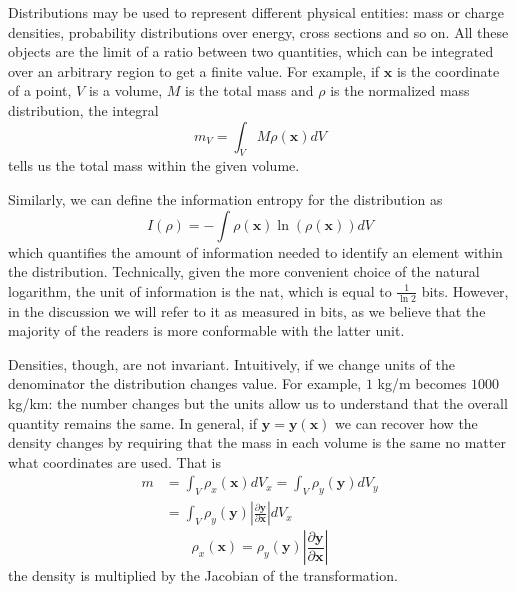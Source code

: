 \documentclass[smallextended]{svjour3}
\numberwithin{equation}{section}
\theoremstyle{definition}
\begin{document}
Distributions may be used to represent different  physical entities: mass or charge densities, probability distributions over energy, cross sections and so on. All these objects are the limit of a ratio between two quantities, which can be integrated over an arbitrary region to get a finite value. For example, if $\mathbf{x}$ is the coordinate of a point, $V$ is a volume, $M$ is the total mass and $\rho$ is the normalized mass distribution, the integral
\begin{equation}
m_V =\int_V M \rho(\mathbf{x}) dV
\end{equation}
tells us the total mass within the given volume.

Similarly, we can define the information entropy for the distribution as
\begin{equation}
I(\rho) =-\int \rho(\mathbf{x}) \ln (\rho(\mathbf{x})) dV
\end{equation}
which quantifies the amount of information needed to identify an element within the distribution. Technically, given the more convenient choice of the natural logarithm, the unit of information is the nat, which is equal to $\frac{1}{\ln 2}$ bits. However, in the discussion we will refer to it as measured in bits, as we believe that the majority of the readers is more conformable with the latter unit.

Densities, though, are not invariant. Intuitively, if we change units of the denominator the distribution changes value. For example, $1$ kg/m becomes $1000$ kg/km: the number changes but the units allow us to understand that the overall quantity remains the same. In general, if $\mathbf{y}=\mathbf{y}(\mathbf{x})$ we can recover how the density changes by requiring that the mass in each volume is the same no matter what coordinates are used. That is
\begin{align*}
m &=\int_V \rho_x(\mathbf{x}) dV_x = \int_V \rho_y(\mathbf{y}) dV_y \\
&=\int_V\rho_y(\mathbf{y}) \left|\frac{\partial \mathbf{y}}{\partial \mathbf{x}}\right| dV_x
\end{align*}
\begin{equation}\label{density_transformation}
\rho_x(\mathbf{x}) = \rho_y(\mathbf{y}) \left|\frac{\partial \mathbf{y}}{\partial \mathbf{x}}\right|
\end{equation}
the density is multiplied by the Jacobian of the transformation.
\end{document}
